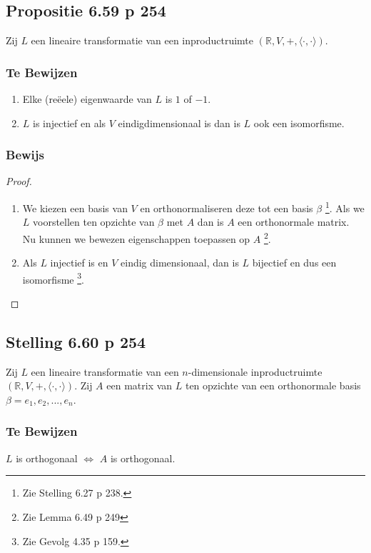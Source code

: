 \documentclass[lineaire_algebra_oplossingen.tex]{subfiles}
\begin{document}
\subsection{Propositie 6.59 p 254}
Zij $L$ een lineaire transformatie van een inproductruimte $(\mathbb{R},V,+,\langle \cdot,\cdot \rangle)$.
\subsubsection*{Te Bewijzen}
\begin{enumerate}
\item Elke (re\"eele) eigenwaarde van $L$ is $1$ of $-1$.
\item $L$ is injectief en als $V$ eindigdimensionaal is dan is $L$ ook een isomorfisme.
\end{enumerate}
\subsubsection*{Bewijs}
\begin{proof}
\begin{enumerate}
\item
We kiezen een basis van $V$ en orthonormaliseren deze tot een basis $\beta$ \footnote{Zie Stelling 6.27 p 238.}. Als we $L$ voorstellen ten opzichte van $\beta$ met $A$ dan is $A$ een orthonormale matrix.
Nu kunnen we bewezen eigenschappen toepassen op $A$ \footnote{Zie Lemma 6.49 p 249}.

\item
Als $L$ injectief is en $V$ eindig dimensionaal, dan is $L$ bijectief en dus een isomorfisme \footnote{Zie Gevolg 4.35 p 159.}.
\end{enumerate}
\end{proof}

\subsection{Stelling 6.60 p 254}
Zij $L$ een lineaire transformatie van een $n$-dimensionale inproductruimte $(\mathbb{R},V,+,\langle \cdot,\cdot \rangle)$.
Zij $A$ een matrix van $L$ ten opzichte van een orthonormale basis $\beta = e_1,e_2,...,e_n$.

\subsubsection*{Te Bewijzen}
\begin{center}
$L$ is orthogonaal $\Leftrightarrow$ $A$ is orthogonaal.
\end{center}
\end{document}
